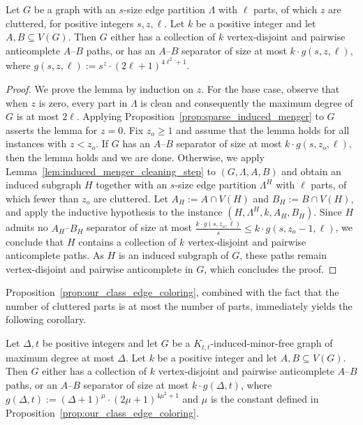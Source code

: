 \begin{lemma}\label{lem:induced_menger_recursive_step}
    Let $G$ be a graph with an $s$-size edge partition $\Lambda$ with $\ell$ parts, of which $z$ are cluttered, for positive integers $s,z,\ell$. Let $k$ be a positive integer and let $A,B \subseteq V(G)$. Then $G$ either has a collection of $k$ vertex-disjoint and pairwise anticomplete $A$--$B$ paths, or has an $A$--$B$ separator of size at most $k \cdot g(s,z,\ell)$, where $g(s,z,\ell) := s^{z} \cdot (2\ell+1)^{4\ell^2+1}$.
\end{lemma}
\begin{proof}
    We prove the lemma by induction on $z$. For the base case, observe that when $z$ is zero, every part in $\Lambda$ is clean and consequently the maximum degree of $G$ is at most $2\ell$. Applying Proposition~\ref{prop:sparse_induced_menger} to $G$ asserts the lemma for $z = 0$.
    Fix $z_o \ge 1$ and assume that the lemma holds for all instances with $z < z_o$. If $G$ has an $A$--$B$ separator of size at most $k \cdot g(s,z_o,\ell)$, then the lemma holds and we are done. Otherwise, we apply Lemma~\ref{lem:induced_menger_cleaning_step} to $(G,\Lambda,A,B)$ and obtain an induced subgraph $H$ together with an $s$-size edge partition $\Lambda^H$ with $\ell$ parts, of which fewer than $z_o$ are cluttered. Let $A_H := A \cap V(H)$ and $B_H := B \cap V(H)$, and apply the inductive hypothesis to the instance $(H,\Lambda^H,k,A_H,B_H)$. Since $H$ admits no $A_H$--$B_H$ separator of size at most $\frac{k\cdot g(s,z_o,\ell)}{s} \le k\cdot g(s,z_o-1,\ell)$, we conclude that $H$ contains a collection of $k$ vertex-disjoint and pairwise anticomplete paths. As $H$ is an induced subgraph of $G$, these paths remain vertex-disjoint and pairwise anticomplete in $G$, which concludes the proof.
\end{proof}

Proposition~\ref{prop:our_class_edge_coloring}, combined with the fact that the number of cluttered parts is at most the number of parts, immediately yields the following corollary.

\begin{corollary}\label{thm:induced_menger_degree_dependent_our_class}
    Let $\Delta, t$ be positive integers and let $G$ be a $K_{t,t}$-induced-minor-free graph of maximum degree at most $\Delta$. Let $k$ be a positive integer and let $A,B \subseteq V(G)$. Then $G$ either has a collection of $k$ vertex-disjoint and pairwise anticomplete $A$--$B$ paths, or an $A$--$B$ separator of size at most $k \cdot g(\Delta,t)$, where $g(\Delta,t) := (\Delta+1)^{\mu} \cdot (2\mu+1)^{4\mu^2+1}$ and $\mu$ is the constant defined in Proposition~\ref{prop:our_class_edge_coloring}.
\end{corollary}

